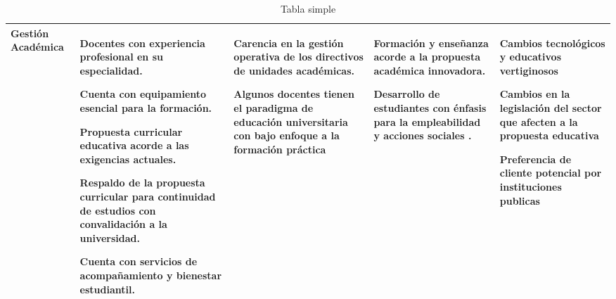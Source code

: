 \documentclass[10pt,a4paper]{article}
\begin{document}
\begin{table}[ht]
\begin{tabular}{m{2cm} m{4cm} m{3cm} m{3cm} m{3cm} }
			Gestión Académica
			& 
			Docentes con experiencia profesional en su especialidad. \par
			Cuenta con equipamiento esencial para la formación.  \par 
			Propuesta curricular educativa acorde a las exigencias actuales. \par 
			Respaldo de la propuesta curricular para continuidad de estudios con convalidación a la universidad. \par 
			Cuenta con servicios de acompañamiento y bienestar estudiantil. \par
			& 
			Carencia en la gestión operativa de los directivos de unidades académicas. \par
			Algunos docentes tienen el paradigma de educación universitaria con bajo enfoque a la formación práctica \par
			& 
			Formación y enseñanza acorde a la propuesta académica innovadora. \par 
			Desarrollo de estudiantes con énfasis para la empleabilidad y acciones sociales . \par
			& 
			Cambios tecnológicos y educativos vertiginosos  \par 
			Cambios en la legislación del sector que afecten a la propuesta educativa \par 
			Preferencia de cliente potencial por instituciones publicas  \par  \\
			\hline
					\end{tabular}
		\caption{Tabla simple}
	\end{table}
\end{document}
